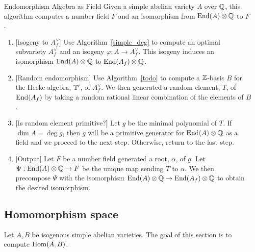 \begin{algorithm}{Endomorphism Algebra as Field}
    Given a simple abelian variety $A$ over $\mathbb{Q}$, this algorithm computes a
    number field $F$ and an isomorphism from $\operatorname{End}(A)\otimes \mathbb{Q}$ to $F$.
    \begin{enumerate}
        \item{} [Isogeny to $A_f ^\vee$]
            Use Algorithm~\ref{simple_deg} to compute an optimal subvariety
            $A_f ^\vee$ and an isogeny $\varphi:A\to A_f ^\vee$. This isogeny
            induces an isomorphism $\operatorname{End}(A)\otimes\mathbb{Q}$ to $\operatorname{End}(A_f)\otimes
            \mathbb{Q}$.
        \item{} [Random endomorphism]
            Use Algorithm~\ref{todo} to compute a $\mathbb{Z}$-basis $B$ for the Hecke
            algebra, $\mathbb{T}'$, of $A_f ^\vee$. We then generated a random
            element, $T$, of $\operatorname{End}(A_f)$ by taking a random rational linear
            combination of the elements of $B$.
        \item{} [Is random element primitive?]
            Let $g$ be the minimal polynomial of $T$. If $\dim A = \deg g$,
            then $g$ will be a primitive generator for $\operatorname{End}(A)\otimes \mathbb{Q}$ as
            a field and we proceed to the next step. Otherwise, return to the
            last step.
        \item{} [Output]
            Let $F$ be a number field generated a root, $\alpha$, of $g$. Let
            $\Psi:\operatorname{End}(A)\otimes \mathbb{Q}\to F$ be the unique map sending $T$ to
            $\alpha$. We then precompose $\Psi$ with the isomorphism
            $\operatorname{End}(A)\otimes \mathbb{Q} \to \operatorname{End}(A_f)\otimes \mathbb{Q}$ to obtain the
            desired isomorphism.
    \end{enumerate}
\end{algorithm}

\subsection{Homomorphism space}%
\label{sub:_hom_a_b_}

Let $A, B$ be isogenous simple abelian varieties. The goal of this section is
to compute $\operatorname{Hom}(A,B)$.

